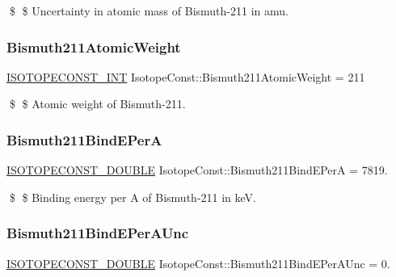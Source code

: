 \$ \$ Uncertainty in atomic mass of Bismuth-\/211 in amu. \mbox{\label{group___isotope_const-_bismuth-_bi211_ga39357396d1a3ee3cc18cebc1c1457486}} 
\subsubsection{\texorpdfstring{Bismuth211\+Atomic\+Weight}{Bismuth211AtomicWeight}}
{\footnotesize\ttfamily \mbox{\hyperlink{group___isotope_const-_macros_ga5f18360b3e99483a35c32d789e62621c}{I\+S\+O\+T\+O\+P\+E\+C\+O\+N\+S\+T\+\_\+\+I\+NT}} Isotope\+Const\+::\+Bismuth211\+Atomic\+Weight = 211}

\$ \$ Atomic weight of Bismuth-\/211. \mbox{\label{group___isotope_const-_bismuth-_bi211_ga96516b304b174cb55634c54cf8fbd822}} 
\subsubsection{\texorpdfstring{Bismuth211\+Bind\+E\+PerA}{Bismuth211BindEPerA}}
{\footnotesize\ttfamily \mbox{\hyperlink{group___isotope_const-_macros_ga8f45a7272ce02c0b4c65c44636ed719a}{I\+S\+O\+T\+O\+P\+E\+C\+O\+N\+S\+T\+\_\+\+D\+O\+U\+B\+LE}} Isotope\+Const\+::\+Bismuth211\+Bind\+E\+PerA = 7819.}

\$ \$ Binding energy per A of Bismuth-\/211 in keV. \mbox{\label{group___isotope_const-_bismuth-_bi211_gabce0cc8fe374ac8e493ffb5001936f57}} 
\subsubsection{\texorpdfstring{Bismuth211\+Bind\+E\+Per\+A\+Unc}{Bismuth211BindEPerAUnc}}
{\footnotesize\ttfamily \mbox{\hyperlink{group___isotope_const-_macros_ga8f45a7272ce02c0b4c65c44636ed719a}{I\+S\+O\+T\+O\+P\+E\+C\+O\+N\+S\+T\+\_\+\+D\+O\+U\+B\+LE}} Isotope\+Const\+::\+Bismuth211\+Bind\+E\+Per\+A\+Unc = 0.}

